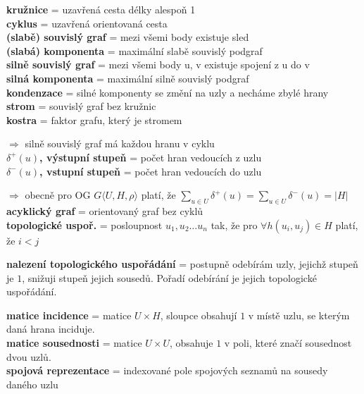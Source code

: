 \documentclass[12pt]{article}
\begin{document}
\noindent
\textbf{kružnice} = uzavřená cesta délky alespoň 1\\
\textbf{cyklus} = uzavřená orientovaná cesta\\

\noindent
\textbf{(slabě) souvislý graf} = mezi všemi body existuje sled\\
\textbf{(slabá) komponenta} = maximální slabě souvislý podgraf\\
\textbf{silně souvislý graf} = mezi všemi body u, v existuje spojení z u do v\\
\textbf{silná komponenta} = maximální silně souvislý podgraf\\

\noindent
\textbf{kondenzace} = silné komponenty se změní na uzly a necháme zbylé hrany\\
\textbf{strom} = souvislý graf bez kružnic\\
\textbf{kostra} = faktor grafu, který je stromem

$\Rightarrow$ silně souvislý graf má každou hranu v cyklu\\

\noindent
\textbf{$\delta^+(u)$, výstupní stupeň} = počet hran vedoucích z uzlu\\
\textbf{$\delta^-(u)$, vstupní stupeň} = počet hran vedoucích do uzlu

$\Rightarrow$ obecně pro OG $G\langle U, H, \rho\rangle$ platí, že $\displaystyle \sum_{u\in U} \delta^+(u) = \sum_{u\in U} \delta^-(u) = \left| H\right|$\\

\noindent
\textbf{acyklický graf} = orientovaný graf bez cyklů\\
\textbf{topologické uspoř.} = posloupnost $u_1, u_2 \ldots u_n$ tak, že pro $\forall h(u_i, u_j) \in H$ platí, že $i<j$

\noindent
\textbf{nalezení topologického uspořádání} = postupně odebírám uzly, jejichž stupeň je $1$, snižuji stupeň jejich sousedů. Pořadí odebírání je jejich topologické uspořádání.

\noindent
\textbf{matice incidence} = matice $U \times H$, sloupce obsahují $1$ v místě uzlu, se kterým daná hrana inciduje.\\
\textbf{matice sousednosti} = matice $U \times U$, obsahuje $1$ v poli, které značí sousednost dvou uzlů.\\
\textbf{spojová reprezentace} = indexované pole spojových seznamů na sousedy daného uzlu\\
\end{document}
